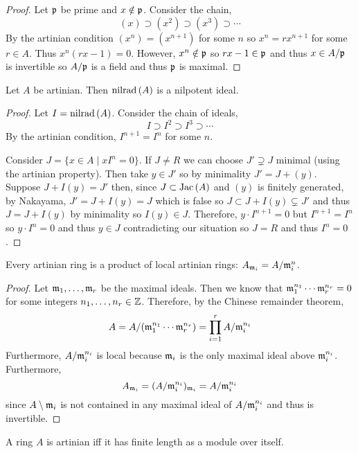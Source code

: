 \documentclass[12pt]{article}
\begin{document}
\begin{proof}
Let $\mathfrak{p}$ be prime and $x \notin \mathfrak{p}$. Consider the chain,
\[ (x) \supset (x^2) \supset (x^3) \supset \cdots \]
By the artinian condition $(x^n) = (x^{n+1})$ for some $n$ so $x^n = r x^{n+1}$ for some $r \in A$. Thus $x^n(rx - 1) = 0$. However, $x^n \notin \mathfrak{p}$ so $rx - 1 \in \mathfrak{p}$ and thus $x \in A / \mathfrak{p}$ is invertible so $A / \mathfrak{p}$ is a field and thus $\mathfrak{p}$ is maximal.
\end{proof}

\begin{prop}
Let $A$ be artinian. Then $\mathrm{nilrad}\left( A \right)$ is a nilpotent ideal.
\end{prop}

\begin{proof}
Let $I = \mathrm{nilrad}\left( A \right)$. Consider the chain of ideals,
\[ I \supset I^2 \supset I^3 \supset \cdots \]
By the artinian condition, $I^{n+1} = I^n$ for some $n$. 

Consider $J = \{ x \in A \mid x I^n = 0 \}$. If $J \neq R$ we can choose $J' \supsetneq J$ minimal (using the artinian property). Then take $y \in J'$ so by minimality $J' = J + (y)$. Suppose $J + I(y) = J'$ then, since $J \subset \mathrm{Jac}\left( A \right)$ and $(y)$ is finitely generated, by Nakayama, $J' = J + I(y) = J$ which is false so $J \subset J + I(y) \subsetneq J'$ and thus $J = J + I(y)$ by minimality so $I(y) \in J$. Therefore, $y \cdot I^{n+1} = 0$ but $I^{n+1} = I^n$ so $y \cdot I^n = 0$ and thus $y \in J$ contradicting our situation so $J = R$ and thus $I^n = 0$.
\end{proof}

\begin{prop}
Every artinian ring is a product of local artinian rings: $A_{\mathfrak{m}_i} = A / \mathfrak{m}_i^n$.
\end{prop}

\begin{proof}
Let $\mathfrak{m}_1, \dots, \mathfrak{m}_r$ be the maximal ideals. Then we know that $\mathfrak{m}_1^{n_1} \cdots \mathfrak{m}_r^{n_r} = 0$ for some integers $n_1, \dots, n_r \in \mathbb{Z}$. Therefore, by the Chinese remainder theorem,
\[ A = A / (\mathfrak{m}_1^{n_1} \cdots \mathfrak{m}_r^{n_r}) = \prod_{i = 1}^r A / \mathfrak{m}_i^{n_i} \]
Furthermore, $A / \mathfrak{m}_i^{n_i}$ is local because $\mathfrak{m}_i$ is the only maximal ideal above $\mathfrak{m}_i^{n_i}$. Furthermore, 
\[ A_{\mathfrak{m}_i} = (A / \mathfrak{m}_i^{n_i})_{\mathfrak{m}_i} = A / \mathfrak{m}_i^{n_i} \]
since $A \setminus \mathfrak{m}_i$ is not contained in any maximal ideal of $A / \mathfrak{m}_i^{n_i}$ and thus is invertible.   
\end{proof}

\begin{prop}
A ring $A$ is artinian iff it has finite length as a module over itself.
\end{prop}
\end{document}
